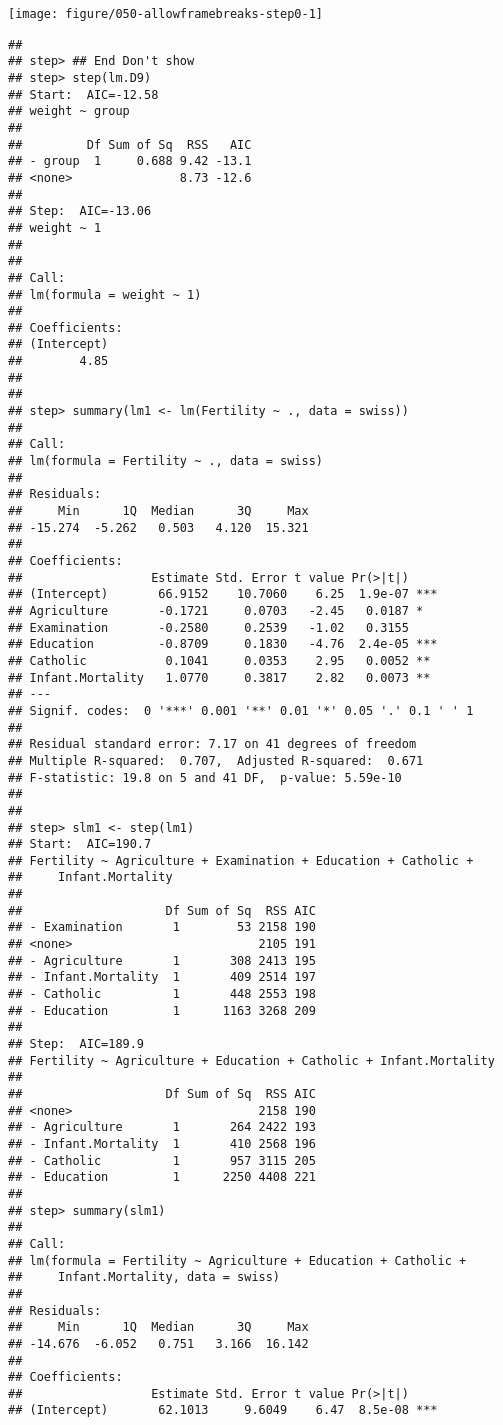 \documentclass{beamer}\usepackage[]{graphicx}\usepackage[]{color}
\newenvironment{knitrout}{}{} %
\begin{document}
\begin{frame}
\begin{knitrout}
\texttt{[image: figure/050-allowframebreaks-step0-1]} 
\begin{verbatim}
## 
## step> ## End Don't show
## step> step(lm.D9)
## Start:  AIC=-12.58
## weight ~ group
## 
##         Df Sum of Sq  RSS   AIC
## - group  1     0.688 9.42 -13.1
## <none>               8.73 -12.6
## 
## Step:  AIC=-13.06
## weight ~ 1
## 
## 
## Call:
## lm(formula = weight ~ 1)
## 
## Coefficients:
## (Intercept)  
##        4.85  
## 
## 
## step> summary(lm1 <- lm(Fertility ~ ., data = swiss))
## 
## Call:
## lm(formula = Fertility ~ ., data = swiss)
## 
## Residuals:
##     Min      1Q  Median      3Q     Max 
## -15.274  -5.262   0.503   4.120  15.321 
## 
## Coefficients:
##                  Estimate Std. Error t value Pr(>|t|)    
## (Intercept)       66.9152    10.7060    6.25  1.9e-07 ***
## Agriculture       -0.1721     0.0703   -2.45   0.0187 *  
## Examination       -0.2580     0.2539   -1.02   0.3155    
## Education         -0.8709     0.1830   -4.76  2.4e-05 ***
## Catholic           0.1041     0.0353    2.95   0.0052 ** 
## Infant.Mortality   1.0770     0.3817    2.82   0.0073 ** 
## ---
## Signif. codes:  0 '***' 0.001 '**' 0.01 '*' 0.05 '.' 0.1 ' ' 1
## 
## Residual standard error: 7.17 on 41 degrees of freedom
## Multiple R-squared:  0.707,	Adjusted R-squared:  0.671 
## F-statistic: 19.8 on 5 and 41 DF,  p-value: 5.59e-10
## 
## 
## step> slm1 <- step(lm1)
## Start:  AIC=190.7
## Fertility ~ Agriculture + Examination + Education + Catholic + 
##     Infant.Mortality
## 
##                    Df Sum of Sq  RSS AIC
## - Examination       1        53 2158 190
## <none>                          2105 191
## - Agriculture       1       308 2413 195
## - Infant.Mortality  1       409 2514 197
## - Catholic          1       448 2553 198
## - Education         1      1163 3268 209
## 
## Step:  AIC=189.9
## Fertility ~ Agriculture + Education + Catholic + Infant.Mortality
## 
##                    Df Sum of Sq  RSS AIC
## <none>                          2158 190
## - Agriculture       1       264 2422 193
## - Infant.Mortality  1       410 2568 196
## - Catholic          1       957 3115 205
## - Education         1      2250 4408 221
## 
## step> summary(slm1)
## 
## Call:
## lm(formula = Fertility ~ Agriculture + Education + Catholic + 
##     Infant.Mortality, data = swiss)
## 
## Residuals:
##     Min      1Q  Median      3Q     Max 
## -14.676  -6.052   0.751   3.166  16.142 
## 
## Coefficients:
##                  Estimate Std. Error t value Pr(>|t|)    
## (Intercept)       62.1013     9.6049    6.47  8.5e-08 ***

\end{verbatim}
\end{knitrout}
\end{frame}
\end{document}
